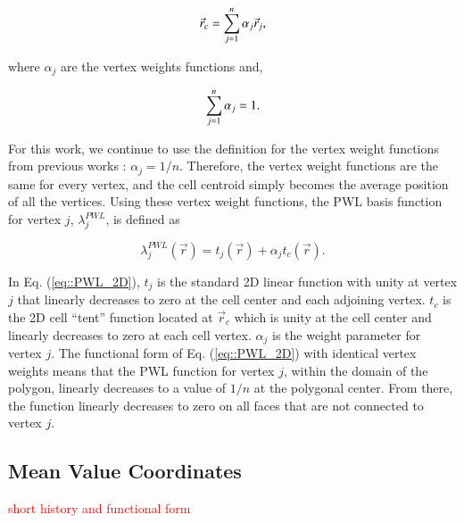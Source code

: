 \documentclass[preprint,10pt]{elsarticle}
\newcommand{\tcr}[1]{\textcolor{red}{#1}}
\begin{document}
\begin{equation}
\label{eq::PWL_2D_centroid}
	\vec{r}_{c} =  \sum\displaylimits_{j=1}^{n} \alpha_{j} \vec{r}_j ,
\end{equation}

\noindent where $\alpha_{j}$ are the vertex weights functions and, 

\begin{equation}
\label{eq::PWL_2D_vertex_weight_sum}
 \sum\displaylimits_{j=1}^{n} \alpha_{j} = 1.
\end{equation}

\noindent For this work, we continue to use the definition for the vertex weight functions from previous works \cite{ref::PWLD_stone_adams,ref::PWLD_stone_adams_unstructured,bailey2008phd}: $\alpha_{j}= 1/n$. Therefore, the vertex weight functions are the same for every vertex, and the cell centroid simply becomes the average position of all the vertices. Using these vertex weight functions, the PWL basis function for vertex $j$, $\lambda_j^{PWL}$, is defined as

\begin{equation}
\label{eq::PWL_2D}
\lambda_j^{PWL} (\vec{r}) = t_j (\vec{r}) + \alpha_j t_c (\vec{r}) .
\end{equation}

\noindent In Eq. (\ref{eq::PWL_2D}), $t_j$ is the standard 2D linear function with unity at vertex $j$ that linearly decreases to zero at the cell center and each adjoining vertex. $t_c$ is the 2D cell ``tent'' function located at $\vec{r}_{c}$ which is unity at the cell center and linearly decreases to zero at each cell vertex. $\alpha_{j}$ is the weight parameter for vertex $j$. The functional form of Eq. (\ref{eq::PWL_2D}) with identical vertex weights means that the PWL function for vertex $j$, within the domain of the polygon, linearly decreases to a value of $1/n$ at the polygonal center. From there, the function linearly decreases to zero on all faces that are not connected to vertex $j$.

\subsection{Mean Value Coordinates}

\tcr{short history and functional form}
\end{document}
